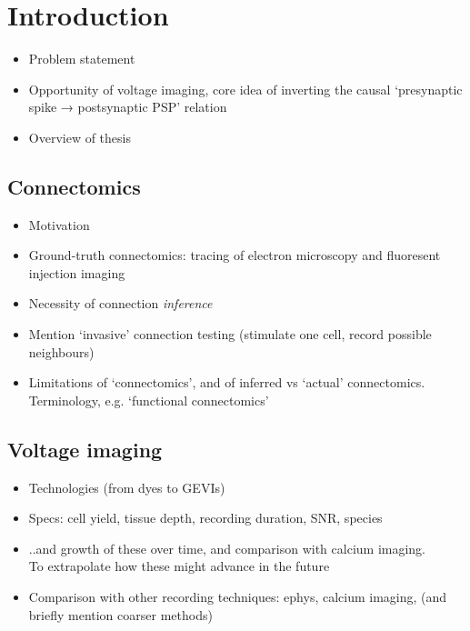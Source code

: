 \documentclass[a4paper, oneside, 11pt]{memoir}
\begin{document}
\chapter{Introduction}

\begin{itemize}
    \item Problem statement
    \item Opportunity of voltage imaging, core idea of inverting the causal `presynaptic spike → postsynaptic PSP' relation
    \item Overview of thesis
\end{itemize}


\section{Connectomics}

\begin{itemize}
    \item Motivation
    \item Ground-truth connectomics: tracing of electron microscopy and fluoresent injection imaging
    \item Necessity of connection \emph{inference}
    \item Mention `invasive' connection testing (stimulate one cell, record possible neighbours)
    \item Limitations of `connectomics', and of inferred vs `actual' connectomics.\\
        Terminology, e.g. `functional connectomics'
\end{itemize}


\section{Voltage imaging}

\begin{itemize}
    \item Technologies (from dyes to GEVIs)
    \item Specs: cell yield, tissue depth, recording duration, SNR, species
    \item ..and growth of these over time, and comparison with calcium imaging.\\
        To extrapolate how these might advance in the future
    \item Comparison with other recording techniques: ephys, calcium imaging, (and briefly mention coarser methods)
\end{itemize}
\end{document}
